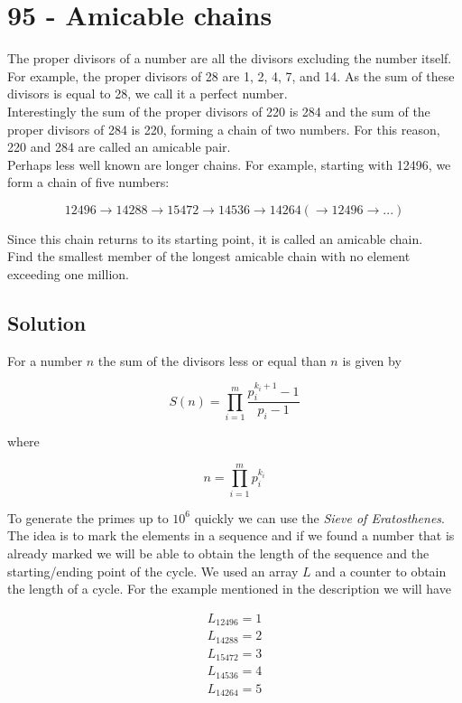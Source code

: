 \chapter*{95 - Amicable chains}

The proper divisors of a number are all the divisors excluding the number itself. For example, the proper divisors of 28 are 1, 2, 4, 7, and 14. As the sum of these divisors is equal to 28, we call it a perfect number.\\

Interestingly the sum of the proper divisors of 220 is 284 and the sum of the proper divisors of 284 is 220, forming a chain of two numbers. For this reason, 220 and 284 are called an amicable pair.\\

Perhaps less well known are longer chains. For example, starting with 12496, we form a chain of five numbers:

$$
12496 \rightarrow 14288 \rightarrow 15472 \rightarrow  14536 \rightarrow  14264  (\rightarrow  12496 \rightarrow  ...)
$$

Since this chain returns to its starting point, it is called an amicable chain.\\

Find the smallest member of the longest amicable chain with no element exceeding one million.

\section*{Solution}

For a number $n$ the sum of the divisors less or equal than $n$ is given by

$$
S(n) = \prod_{i=1}^m \frac{p_i^{k_i+1} - 1}{p_i - 1}
$$

where 

$$
n = \prod_{i=1}^m p_i^{k_i}
$$

To generate the primes up to $10^6$ quickly we can use the \textit{Sieve of Eratosthenes}.\\

The idea is to mark the elements in a sequence and if we found a number that is already marked we will be able to obtain the length of the sequence and the starting/ending point of the cycle. We used an array $L$ and a counter to obtain the length of a cycle. For the example mentioned in the description we will have

\begin{align*}
    L_{12496} = 1 \\
    L_{14288} = 2 \\
    L_{15472} = 3 \\
    L_{14536} = 4 \\
    L_{14264} = 5
\end{align*}

